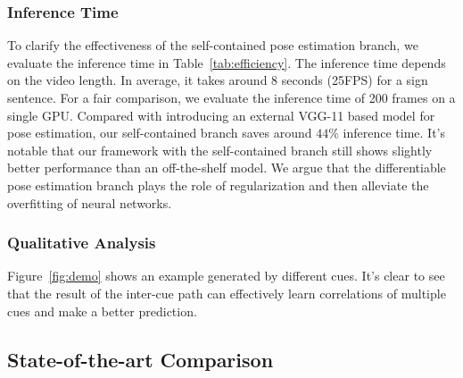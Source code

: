 \documentclass[letterpaper]{article} \usepackage{aaai20}  \usepackage{times}  \usepackage{helvet} \usepackage{courier}  \usepackage[hyphens]{url}  \usepackage{graphicx} \urlstyle{rm} \def\UrlFont{\rm}  \usepackage{graphicx}  \frenchspacing  \setlength{\pdfpagewidth}{8.5in}  \setlength{\pdfpageheight}{11in}
\begin{document}
\subsubsection{Inference Time} 
To clarify the effectiveness of the self-contained pose estimation branch, we evaluate the inference time in Table~\ref{tab:efficiency}. The inference time depends on the video length. In average, it takes around 8 seconds (25FPS) for a sign sentence. For a fair comparison, we evaluate the inference time of 200 frames on a single GPU. Compared with introducing an external VGG-11 based model for pose estimation, our self-contained branch saves around $44\%$ inference time. It's notable that our framework with the self-contained branch still shows slightly better performance than an off-the-shelf model. We argue that the differentiable pose estimation branch plays the role of regularization and then alleviate the overfitting of neural networks. 

\subsubsection{Qualitative Analysis}
Figure~\ref{fig:demo} shows an example generated by different cues. It's clear to see that the result of the inter-cue path can effectively learn correlations of multiple cues and make a better prediction.

\subsection{State-of-the-art Comparison}
\end{document}
